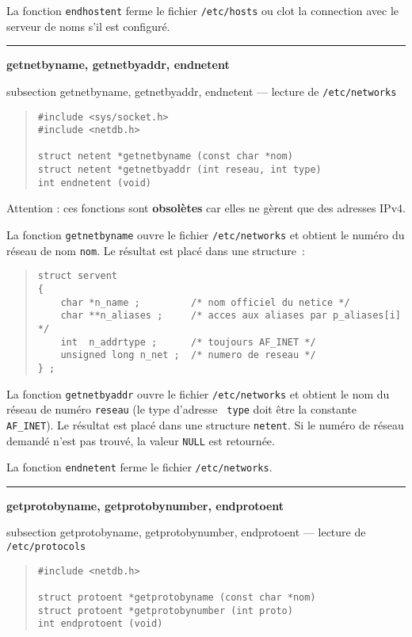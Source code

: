 \documentclass [twoside] {report}
\newcommand {\primitive} [1]
    {
	\phantomsection
	{\large \bf #1}
	\addcontentsline {toc} {subsection} {#1}
    }
\newcommand {\separation}
    {
	\vspace {5mm}
	\nopagebreak
	\hrule
    }
\begin{document}
La fonction {\tt endhostent} ferme le fichier {\tt /etc/hosts} ou clot
la connection avec le serveur de noms s'il est configuré.


\separation
\primitive {getnetbyname, getnetbyaddr,
endnetent} --- lecture de {\tt /etc/networks}

\begin {quote}
\begin {verbatim}
#include <sys/socket.h>
#include <netdb.h>

struct netent *getnetbyname (const char *nom)
struct netent *getnetbyaddr (int reseau, int type)
int endnetent (void)
\end{verbatim}
\end {quote}

Attention : ces fonctions sont \textbf {obsolètes} car elles ne gèrent que
des adresses IPv4.

La fonction {\tt getnetbyname} ouvre le fichier {\tt /etc/networks} et
obtient le numéro du réseau de nom {\tt nom}.  Le résultat est placé
dans une structure~:

\begin {quote}
    \small
\begin {verbatim}
struct servent
{
    char *n_name ;         /* nom officiel du netice */
    char **n_aliases ;     /* acces aux aliases par p_aliases[i] */
    int  n_addrtype ;      /* toujours AF_INET */
    unsigned long n_net ;  /* numero de reseau */
} ;
\end{verbatim}
\end {quote}

La fonction {\tt getnetbyaddr} ouvre le fichier {\tt /etc/networks} et
obtient le nom du réseau de numéro {\tt reseau} (le type d'adresse {\tt
type} doit être la constante {\tt AF\_INET}).  Le résultat est placé
dans une structure {\tt netent}.  Si le numéro de réseau demandé n'est
pas trouvé, la valeur {\tt NULL} est retournée.

La fonction {\tt endnetent} ferme le fichier {\tt /etc/networks}.


\separation
\primitive {getprotobyname, getprotobynumber,
endprotoent} --- lecture de {\tt /etc/protocols}

\begin {quote}
\begin {verbatim}
#include <netdb.h>

struct protoent *getprotobyname (const char *nom)
struct protoent *getprotobynumber (int proto)
int endprotoent (void)
\end{verbatim}
\end {quote}
\end{document}
